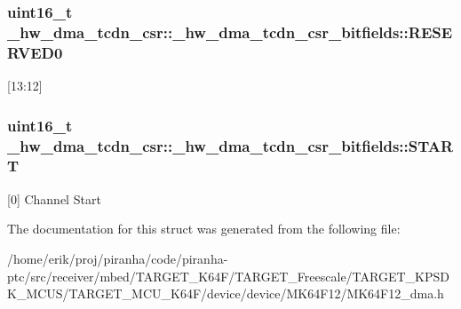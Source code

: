 \subsubsection[{\texorpdfstring{R\+E\+S\+E\+R\+V\+E\+D0}{RESERVED0}}]{\setlength{\rightskip}{0pt plus 5cm}uint16\+\_\+t \+\_\+hw\+\_\+dma\+\_\+tcdn\+\_\+csr\+::\+\_\+hw\+\_\+dma\+\_\+tcdn\+\_\+csr\+\_\+bitfields\+::\+R\+E\+S\+E\+R\+V\+E\+D0}\hypertarget{struct__hw__dma__tcdn__csr_1_1__hw__dma__tcdn__csr__bitfields_a98d51b49562f94f6e53aae75c5960307}{}\label{struct__hw__dma__tcdn__csr_1_1__hw__dma__tcdn__csr__bitfields_a98d51b49562f94f6e53aae75c5960307}
\mbox{[}13\+:12\mbox{]} 
\subsubsection[{\texorpdfstring{S\+T\+A\+RT}{START}}]{\setlength{\rightskip}{0pt plus 5cm}uint16\+\_\+t \+\_\+hw\+\_\+dma\+\_\+tcdn\+\_\+csr\+::\+\_\+hw\+\_\+dma\+\_\+tcdn\+\_\+csr\+\_\+bitfields\+::\+S\+T\+A\+RT}\hypertarget{struct__hw__dma__tcdn__csr_1_1__hw__dma__tcdn__csr__bitfields_affdc2dc2e431b19f8a5e85303c57a82f}{}\label{struct__hw__dma__tcdn__csr_1_1__hw__dma__tcdn__csr__bitfields_affdc2dc2e431b19f8a5e85303c57a82f}
\mbox{[}0\mbox{]} Channel Start 

The documentation for this struct was generated from the following file\+:\begin{DoxyCompactItemize}
\item 
/home/erik/proj/piranha/code/piranha-\/ptc/src/receiver/mbed/\+T\+A\+R\+G\+E\+T\+\_\+\+K64\+F/\+T\+A\+R\+G\+E\+T\+\_\+\+Freescale/\+T\+A\+R\+G\+E\+T\+\_\+\+K\+P\+S\+D\+K\+\_\+\+M\+C\+U\+S/\+T\+A\+R\+G\+E\+T\+\_\+\+M\+C\+U\+\_\+\+K64\+F/device/device/\+M\+K64\+F12/M\+K64\+F12\+\_\+dma.\+h\end{DoxyCompactItemize}
